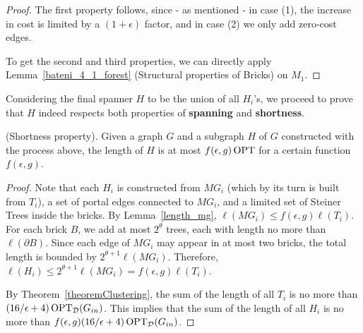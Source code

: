 \begin{proof}
    The first property follows, since - as mentioned - in case (1), the increase in cost is limited by a \((1 + \epsilon)\) factor, and in case (2) we only add zero-cost edges.
    
    To get the second and third properties, we can directly apply Lemma~\ref{bateni_4_1_forest} (Structural properties of Bricks) on \(M_1\). 
\end{proof}

Considering the final spanner \(H\) to be the union of all \(H_i\)'s, we proceed to prove that \(H\) indeed respects both properties of \textbf{spanning} and \textbf{shortness}.

\begin{lemma}{{(Shortness property).}}\label{spanner_shortness_property} Given a graph \(G\) and a subgraph \(H\) of \(G\) constructed with the process above, the length of \(H\) is at most \(f(\epsilon, g) \operatorname{\textrm{OPT}}\) for a certain function
\(f(\epsilon, g)\).
\end{lemma}
\begin{proof}
Note that each \(H_i\) is constructed from \(MG_i\) (which by its turn is built from \(T_i\)), a set of portal edges connected to \(MG_i\), and a limited set of Steiner Trees inside the bricks. By Lemma~\ref{length_mg}, \(\ell(MG_i) \leq f(\epsilon, g) \ell(T_i)\). For each brick \(B\), we add at most \(2^{\theta}\) trees, each with length no more than \(\ell(\partial B)\). Since each edge of \(MG_i\) may appear in at most two bricks, the total length is bounded by \(2^{\theta + 1} \ell(MG_i)\). Therefore, \(\ell(H_i) \leq 2^{\theta + 1} \ell(MG_i) = f(\epsilon, g) \ell(T_i)\).

By Theorem~\ref{theoremClustering}, the sum of the length of all \(T_i\) is no more than \((16/\epsilon + 4) \operatorname{\textrm{OPT}}_{\mathcal{D}}(G_{in})\).
This implies that the sum of the length of all \(H_i\) is no more than \(f(\epsilon, g) (16/\epsilon + 4) \operatorname{\textrm{OPT}}_{\mathcal{D}}(G_{in})\).
\end{proof}

